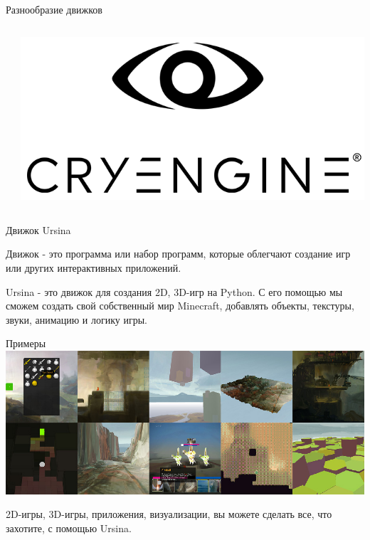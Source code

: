 \documentclass[handout]{beamer}
\begin{document}
\begin{frame}{Разнообразие движков}
\begin{columns}
\begin{column}{0.33\textwidth}
            \end{column}
            \begin{column}{0.3\textwidth}
                \includegraphics[width=\textwidth]{img/cryengine.png}
            \end{column}
        \end{columns}
    \end{frame}

    \begin{frame}{Движок Ursina}
        \begin{tcolorbox}[colback=blue!5,colframe=blue!75!black]
           Движок - это программа или набор программ, которые облегчают создание игр или других интерактивных приложений. 
        \end{tcolorbox}
        \begin{tcolorbox}[colback=blue!5,colframe=blue!75!black]
           Ursina - это движок для создания 2D, 3D-игр на Python. С его помощью мы сможем создать свой собственный мир Minecraft, добавлять объекты, текстуры, звуки, анимацию и логику игры.
        \end{tcolorbox}
    \end{frame}

    \begin{frame}{Примеры}
        \includegraphics[width=\textwidth]{img/made_with_ursina.jpg}
        \begin{justify}
            2D-игры, 3D-игры, приложения, визуализации, вы можете сделать все, что захотите, с помощью Ursina.
        \end{justify}
    \end{frame}
\end{document}
